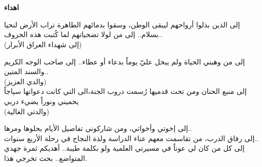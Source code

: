 \chapter*{}

\begin{center}
	\Large\textbf{اهداء}
\end{center}

\begin{center}
	
	\amirifont
	إلى الذين بذلوا أرواحهم ليبقى الوطن، وسقوا بدمائهم الطاهرة تراب الأرض لنحيا بسلام.. إلى من لولا تضحياتهم لما كُتبت هذه الحروف..\\
	(إلى شهداء العراق الأبرار)
	
	إلى من وهبني الحياة ولم يبخل عليّ يوماً بدعاء أو عطاء.. إلى صاحب الوجه الكريم والسند المتين..\\
	(والدي العزيز)\\
	​  
	إلى منبع الحنان ومن تحت قدميها رُسمت دروب الجنة،الى التي كانت دعواتها سياجاً يحميني ونوراً يضيء دربي\\
	(والدتي الغالية)
	
	إلى إخوتي وأخواتي، ومن شاركوني تفاصيل الأيام بحلوها ومرها..\\
	إلى رفاق الدرب، من تقاسمت معهم عناء الدراسة ولذة النجاح في رحلة الأربع سنوات..\\
	إلى كل من كان لي عوناً في مسيرتي العلمية ولو بكلمة طيبة..
	​أهديكم ثمرة جهدي المتواضع.. بحث تخرجي هذا.
\end{center}